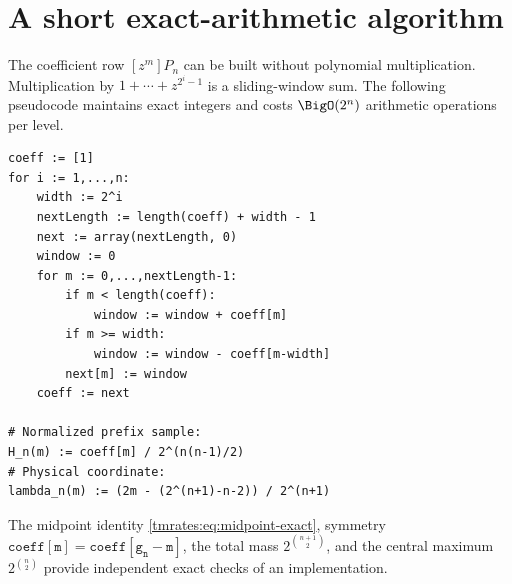 \documentclass[11pt,oneside]{article}
\theoremstyle{definition}
\theoremstyle{remark}
\begin{document}
\section{A short exact-arithmetic algorithm}
\label{tmrates:app:algorithm}

The coefficient row $[z^m]P_n$ can be built without polynomial multiplication.  Multiplication
by $1+\cdots+z^{2^i-1}$ is a sliding-window sum.  The following pseudocode maintains exact
integers and costs $\BigO(2^n)$ arithmetic operations per level.

\begin{lstlisting}[style=pseudo]
coeff := [1]
for i := 1,...,n:
    width := 2^i
    nextLength := length(coeff) + width - 1
    next := array(nextLength, 0)
    window := 0
    for m := 0,...,nextLength-1:
        if m < length(coeff):
            window := window + coeff[m]
        if m >= width:
            window := window - coeff[m-width]
        next[m] := window
    coeff := next

# Normalized prefix sample:
H_n(m) := coeff[m] / 2^(n(n-1)/2)
# Physical coordinate:
lambda_n(m) := (2m - (2^(n+1)-n-2)) / 2^(n+1)
\end{lstlisting}

The midpoint identity \eqref{tmrates:eq:midpoint-exact}, symmetry
$\mathtt{coeff[m]}=\mathtt{coeff[g_n-m]}$, the total mass
$2^{\binom{n+1}{2}}$, and the central maximum $2^{\binom n2}$ provide independent exact
checks of an implementation.
\end{document}
